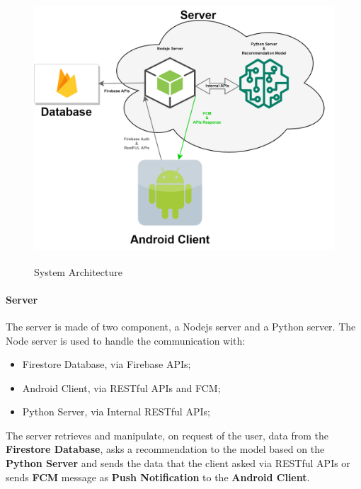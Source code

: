 \documentclass[../../main]{subfiles}
\begin{document}
    \begin{figure}[h]
        \centering
        \includegraphics[width=150mm,height=100mm]{images/system_architecture.png}
        \caption{System Architecture}\label{system_architecture}
    \end{figure}

\paragraph*{Server}

The server is made of two component, a Nodejs server and a Python server.
The Node server is used to handle the communication with:
\begin{itemize}
    \item Firestore Database, via Firebase APIs;
    \item Android Client, via RESTful APIs and FCM;
    \item Python Server, via Internal RESTful APIs;
\end{itemize}
The server retrieves and manipulate, on request of the user, data from the \textbf{Firestore Database}, 
asks a recommendation to the model based on the \textbf{Python Server} 
and sends the data that the client asked via RESTful APIs or sends \textbf{FCM} message as \textbf{Push Notification} to the \textbf{Android Client}.
\end{document}
